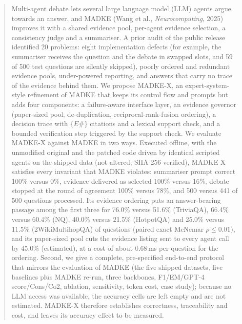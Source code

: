 \begin{abstract}
Multi-agent debate lets several large language model (LLM) agents argue towards an answer, and MADKE (Wang et al., \emph{Neurocomputing}, 2025) improves it with a shared evidence pool, per-agent evidence selection, a consistency judge and a summariser. A prior audit of the public release identified 20 problems: eight implementation defects (for example, the summariser receives the question and the debate in swapped slots, and 59 of 500 test questions are silently skipped), poorly ordered and redundant evidence pools, under-powered reporting, and answers that carry no trace of the evidence behind them. We propose MADKE-X, an expert-system-style refinement of MADKE that keeps its control flow and prompts but adds four components: a failure-aware interface layer, an evidence governor (paper-sized pool, de-duplication, reciprocal-rank-fusion ordering), a decision trace with $\{E\#\}$ citations and a lexical support check, and a bounded verification step triggered by the support check. We evaluate MADKE-X against MADKE in two ways. Executed offline, with the unmodified original and the patched code driven by identical scripted agents on the shipped data (not altered; SHA-256 verified), MADKE-X satisfies every invariant that MADKE violates: summariser prompt correct 100\% versus 0\%, evidence delivered as selected 100\% versus 16\%, debate stopped at the round of agreement 100\% versus 78\%, and 500 versus 441 of 500 questions processed. Its evidence ordering puts an answer-bearing passage among the first three for 76.0\% versus 51.6\% (TriviaQA), 66.4\% versus 60.4\% (NQ), 40.0\% versus 21.5\% (HotpotQA) and 25.0\% versus 11.5\% (2WikiMultihopQA) of questions (paired exact McNemar $p\le 0.01$), and its paper-sized pool cuts the evidence listing sent to every agent call by 45.0\% (estimated), at a cost of about 0.68\,ms per question for the ordering. Second, we give a complete, pre-specified end-to-end protocol that mirrors the evaluation of MADKE (the five shipped datasets, five baselines plus MADKE re-run, three backbones, F1/EM/GPT-4 score/Cons/Co2, ablation, sensitivity, token cost, case study); because no LLM access was available, the accuracy cells are left empty and are not estimated. MADKE-X therefore establishes correctness, traceability and cost, and leaves its accuracy effect to be measured.
\end{abstract}
